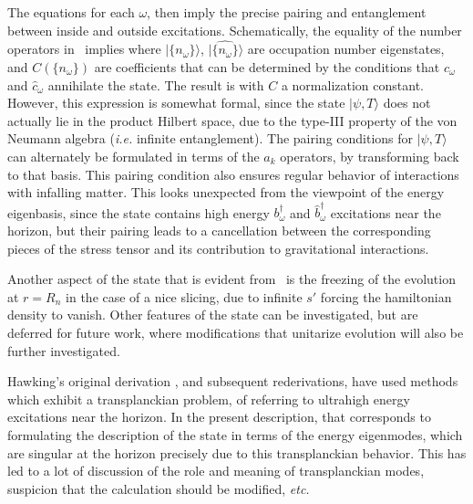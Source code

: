 The equations
%
\eqn{}
%
for each $\omega$, then imply the precise pairing and entanglement between inside and outside excitations.  Schematically, 
the equality of the number operators in \pairing\ implies
%
\eqn{}
%
where $ |\{n_\omega\}\rangle$, $ |\widehat{\{n_\omega\}}\rangle$ are occupation number eigenstates, and $C\left(\{n_\omega\}\right)$ are coefficients   that can be determined by the conditions that $c_\omega$ and $\hat c_\omega$ annihilate the state.  The result is 
%
\eqn{}
%
with $C$ a normalization constant.
However, this expression is somewhat formal, since the state $|\psi,T\rangle$ does not actually lie in the product Hilbert space, due to the type-III property of the von Neumann algebra ({\it i.e.} infinite entanglement). 
The pairing conditions for  $|\psi,T\rangle$ can alternately be formulated in terms of the $a_k$ operators, by transforming back to that basis.  This pairing condition also ensures regular behavior of interactions with infalling matter.  This looks unexpected from the viewpoint of the energy eigenbasis, since the state contains high energy $b^\dagger_\omega$ and $\hat b^\dagger_\omega$ excitations near the horizon, but their pairing leads to a cancellation between the corresponding pieces of the stress tensor and its contribution to gravitational interactions.

Another aspect of the state that is evident from \hamr\ is the freezing of the evolution at $r=R_n$ in the case of a nice slicing, due to infinite $s'$ forcing the hamiltonian density to vanish.  Other features of the state can be investigated, but are deferred for future work, where modifications that unitarize evolution will also be further investigated.


Hawking's original derivation , and subsequent rederivations, have used methods which exhibit a transplanckian problem, of referring to ultrahigh energy excitations near the horizon.  In the present description, that corresponds to formulating the description of the state in terms of the energy eigenmodes, which are singular at the horizon precisely due to this transplanckian behavior.  This has led to a lot of discussion of the role and meaning of transplanckian modes, suspicion that the calculation should be modified, {\it etc.}  

